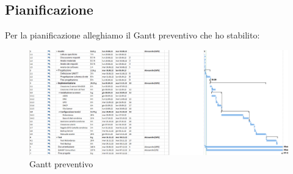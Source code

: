 \documentclass[../main.tex]{subfiles}
\begin{document}
\pagebreak{}
\thispagestyle{header-pages}
\subsection{Pianificazione}

Per la pianificazione alleghiamo il Gantt preventivo che ho stabilito:
 \begin{figure}[h]
    \centering
    \includegraphics[width=1\textwidth]{Images/GANTT_Preventivo_Completo.jpg}
    \caption{Gantt preventivo}
\end{figure}
\end{document}

